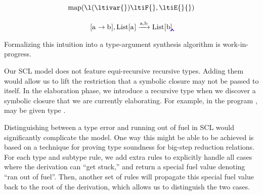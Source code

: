 \[
\begin{array}{c}
\ltiapp{\text{map}}{\ltiufun{{\tikz[overlay,remember picture] \node [] (b2) {};}\ltivar{}}
                             {\ltiF{}}{\tikz[overlay,remember picture] \node [] (c0) {};},
                             \ltiE{}{\tikz[overlay,remember picture] \node [] (a0) {};}} \\\\
\ltiPolyFn{\ltiFn{\text{a}_{\tikz[overlay,remember picture] \node [] (b) {};}}
                 {\text{b}^{\tikz[overlay,remember picture] \node [] (c) {};}}
                 ,
          {\text{List[a}_{\tikz[overlay,remember picture] \node [] (a) {};}
                 \text{]}}
                 }
          {\text{a,b}}
          {\text{List[}^{\tikz[overlay,remember picture] \node [] (d) {};}
           \text{b]}}
\begin{tikzpicture}[remember picture, overlay,
                  text width = 2.5cm ]
  \coordinate (Start0) at (a0);
  \coordinate (End0) at (a);
  \coordinate (Start1) at (a);
  \coordinate (End1) at (b);
  \coordinate (Start1b) at (b);
  \coordinate (End1b) at (b2);
  \coordinate (Start2a) at (c0);
  \coordinate (End2a) at (c);
  \coordinate (Start2) at (c);
  \coordinate (End2) at (d);
  \draw[blue,dotted,thick,->](Start0.south) to (End0.east);
  \draw[red,->,bend right=-45](Start1.south) to (End1.east);
  \draw[blue,dotted,thick,->](Start1b.south) to (End1b.east);
  \draw[blue,dotted,thick,->](Start2a.south) to (End2a.east);
  \draw[red,->,bend right=-45](Start2.east) to (End2.north east);
\end{tikzpicture} 
\end{array}
\]

Formalizing this intuition into a type-argument synthesis algorithm is work-in-progress.

Our SCL model does not feature equi-recursive recursive types. Adding them would allow us to
lift the restriction that a symbolic closure may not be passed to itself.
In the elaboration phase, we introduce a recursive type when we discover
a symbolic closure that we are currently elaborating.
For example, in the program \ltilet{\ltivar{}}{\ltiufun{\ltivar{}}{\ltivar{}}}{\ltiapp{\ltivar{}}{\ltivar{}}},
{\ltivar{}} may be given type
\ltiFn{\ltiMu{\ltivar{}}{\ltiFn{\ltivar{}}{\ltivar{}}}}
      {\ltiMu{\ltivar{}}{\ltiFn{\ltivar{}}{\ltivar{}}}}.

Distinguishing between a type error
and running out of fuel in SCL would significantly complicate the model.
One way this might be able to be achieved is based on a technique for
proving type soundness for big-step reduction relations.
For each type and subtype rule, we add extra rules to explicitly
handle all cases where the derivation can ``get stuck,''
and return a special fuel value denoting ``ran out of fuel''.
Then, another set of rules will propagate this special fuel value
back to the root of the derivation, which allows us to distinguish
the two cases.


